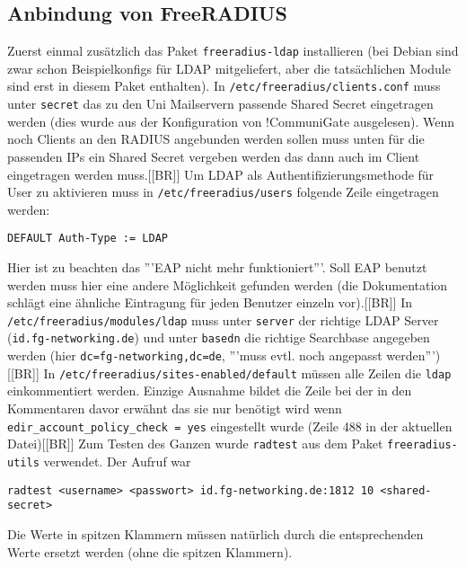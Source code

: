 \documentclass[11pt,a4paper,titlepage=firstiscover]{scrartcl} %
\begin{document}
\subsection{Anbindung von FreeRADIUS}
Zuerst einmal zusätzlich das Paket \texttt{freeradius-ldap} installieren (bei Debian sind zwar schon Beispielkonfigs für LDAP mitgeliefert, aber die tatsächlichen Module sind erst in diesem Paket enthalten). In \texttt{/etc/freeradius/clients.conf} muss unter \texttt{secret} das zu den Uni Mailservern passende Shared Secret eingetragen werden (dies wurde aus der Konfiguration von !CommuniGate ausgelesen). Wenn noch Clients an den RADIUS angebunden werden sollen muss unten für die passenden IPs ein Shared Secret vergeben werden das dann auch im Client eingetragen werden muss.[[BR]]
Um LDAP als Authentifizierungsmethode für User zu aktivieren muss in \texttt{/etc/freeradius/users} folgende Zeile eingetragen werden:
\begin{lstlisting}
DEFAULT Auth-Type := LDAP
\end{lstlisting}
Hier ist zu beachten das '''EAP nicht mehr funktioniert'''. Soll EAP benutzt werden muss hier eine andere Möglichkeit gefunden werden (die Dokumentation schlägt eine ähnliche Eintragung für jeden Benutzer einzeln vor).[[BR]]
In \texttt{/etc/freeradius/modules/ldap} muss unter \texttt{server} der richtige LDAP Server (\texttt{id.fg-networking.de}) und unter \texttt{basedn} die richtige Searchbase angegeben werden (hier \texttt{dc=fg-networking,dc=de}, '''muss evtl. noch angepasst werden''')[[BR]]
In \texttt{/etc/freeradius/sites-enabled/default} müssen alle Zeilen die \texttt{ldap} einkommentiert werden. Einzige Ausnahme bildet die Zeile bei der in den Kommentaren davor erwähnt das sie nur benötigt wird wenn \texttt{edir_account_policy_check = yes} eingestellt wurde (Zeile 488 in der aktuellen Datei)[[BR]]
Zum Testen des Ganzen wurde \texttt{radtest} aus dem Paket \texttt{freeradius-utils} verwendet. Der Aufruf war
\begin{lstlisting}
radtest <username> <passwort> id.fg-networking.de:1812 10 <shared-secret>
\end{lstlisting}
Die Werte in spitzen Klammern müssen natürlich durch die entsprechenden Werte ersetzt werden (ohne die spitzen Klammern).
\end{document}
